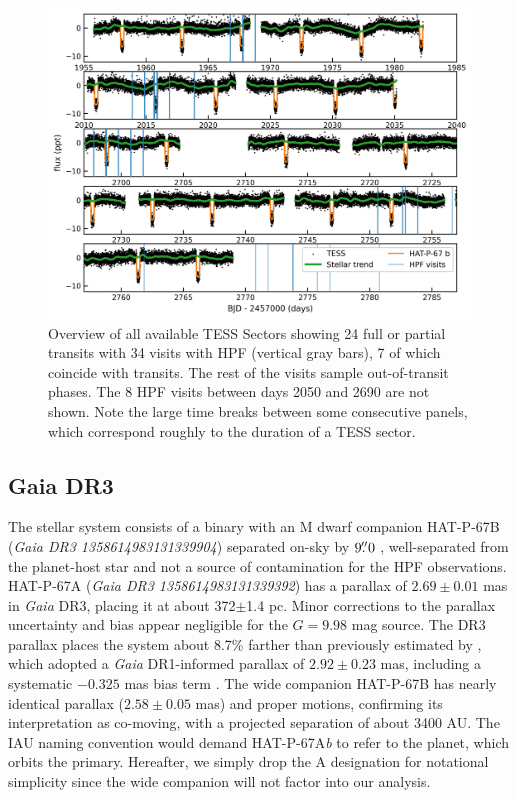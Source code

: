\documentclass[linenumbers, twocolumn, trackchanges]{aastex631}
\begin{document}
\begin{figure}
  \centering
  \includegraphics[width=0.98\linewidth]{TESS_HAT-P-67b_overview.png}
  \caption{Overview of all available TESS Sectors showing 24 full or partial transits with 34 visits with HPF (vertical gray bars), 7 of which coincide with transits.  The rest of the visits sample out-of-transit phases.  The 8 HPF visits between days 2050 and 2690 are not shown.  Note the large time breaks between some consecutive panels, which correspond roughly to the duration of a TESS sector.}
  \label{fig:TESSoverview}
\end{figure}

\subsection{Gaia DR3}\label{gaiadr3}
The stellar system consists of a binary with an M dwarf companion HAT-P-67B (\emph{Gaia DR3 1358614983131339904}) separated on-sky by $9\mbox{$.\!\!^{\prime\prime}$}0$ \citep{2019MNRAS.490.5088M}, well-separated from the planet-host star and not a source of contamination for the HPF observations.  HAT-P-67A (\emph{Gaia DR3 1358614983131339392}) has a parallax of $2.69\pm0.01$ mas in \emph{Gaia} DR3, placing it at about 372$\pm$1.4 pc.  Minor corrections to the parallax uncertainty \citep{2021MNRAS.506.2269E} and bias \citep{2021A&A...649A...4L} appear negligible for the $G=9.98$ mag source.  The DR3 parallax places the system about 8.7\% farther than previously estimated by \citet{2017AJ....153..211Z}, which adopted a \emph{Gaia} DR1-informed parallax of $2.92\pm0.23$ mas, including a systematic $-0.325$ mas bias term \citep{2016ApJ...831L...6S}.  The wide companion HAT-P-67B has nearly identical parallax ($2.58\pm0.05$ mas) and proper motions, confirming its interpretation as co-moving, with a projected separation of about 3400 AU.  The IAU naming convention would demand HAT-P-67A\emph{b} to refer to the planet, which orbits the primary.  Hereafter, we simply drop the A designation for notational simplicity since the wide companion will not factor into our analysis.
\end{document}
